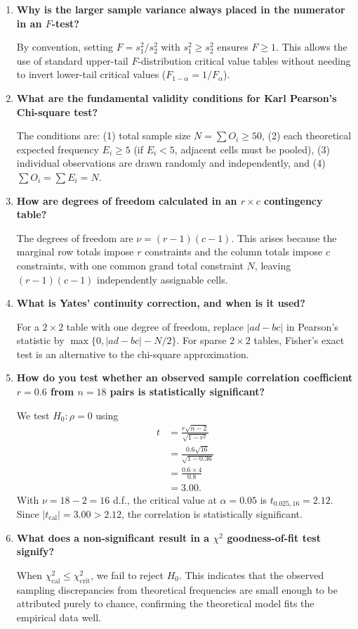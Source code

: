 \documentclass[12pt,a4paper]{article}
\newcommand{\Q}[1]{\textbf{#1}\par\noindent\ignorespaces}
\begin{document}
\begin{tcolorbox}[exambox, title={\textbf{Frequently Asked / Viva Questions}}]
\begin{enumerate}[topsep=0pt, label=\textbf{Q\arabic*.}, itemsep=5pt]
\item \Q{Why is the larger sample variance always placed in the numerator in an $F$-test?}
By convention, setting $F = s_1^2 / s_2^2$ with $s_1^2 \ge s_2^2$ ensures $F \ge 1$. This allows the use of standard upper-tail $F$-distribution critical value tables without needing to invert lower-tail critical values ($F_{1-\alpha} = 1 / F_\alpha$).

\item \Q{What are the fundamental validity conditions for Karl Pearson's Chi-square test?}
The conditions are: (1) total sample size $N = \sum O_i \ge 50$, (2) each theoretical expected frequency $E_i \ge 5$ (if $E_i < 5$, adjacent cells must be pooled), (3) individual observations are drawn randomly and independently, and (4) $\sum O_i = \sum E_i = N$.

\item \Q{How are degrees of freedom calculated in an $r \times c$ contingency table?}
The degrees of freedom are $\nu = (r - 1)(c - 1)$. This arises because the marginal row totals impose $r$ constraints and the column totals impose $c$ constraints, with one common grand total constraint $N$, leaving $(r-1)(c-1)$ independently assignable cells.

\item \Q{What is Yates' continuity correction, and when is it used?}
For a $2\times2$ table with one degree of freedom, replace $|ad-bc|$ in Pearson's statistic by $\max\{0,|ad-bc|-N/2\}$. For sparse $2\times2$ tables, Fisher's exact test is an alternative to the chi-square approximation.

\item \Q{How do you test whether an observed sample correlation coefficient $r = 0.6$ from $n = 18$ pairs is statistically significant?}
We test $H_0: \rho = 0$ using
  \[
    \begin{aligned}
      t &= \frac{r\sqrt{n-2}}{\sqrt{1-r^2}} \\[3pt]
      &= \frac{0.6\sqrt{16}}{\sqrt{1 - 0.36}} \\[3pt]
      &= \frac{0.6 \times 4}{0.8} \\[3pt]
      &= 3.00.
    \end{aligned}
  \]
   With $\nu = 18 - 2 = 16$ d.f., the critical value at $\alpha = 0.05$ is $t_{0.025, 16} = 2.12$. Since $|t_{\text{cal}}| = 3.00 > 2.12$, the correlation is statistically significant.

\item \Q{What does a non-significant result in a $\chi^2$ goodness-of-fit test signify?}
When $\chi^2_{\text{cal}} \le \chi^2_{\text{crit}}$, we fail to reject $H_0$. This indicates that the observed sampling discrepancies from theoretical frequencies are small enough to be attributed purely to chance, confirming the theoretical model fits the empirical data well.
\end{enumerate}
\end{tcolorbox}
\end{document}
